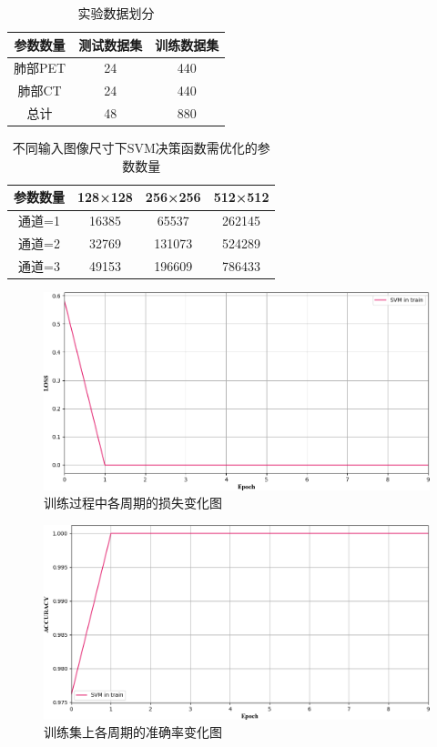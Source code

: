 \documentclass[twocolumn]{article}
\begin{document}
\begin{table}[h]
	\centering
	\caption{实验数据划分}
	\label{tab:dataset_partition_1}
	\begin{tabular}{ccc}
		\toprule
		参数数量 & 测试数据集 & 训练数据集 \\
		\midrule
		肺部PET & 24 & 440 \\
		肺部CT & 24 & 440 \\
		总计 & 48 & 880 \\
		\bottomrule
	\end{tabular}
\end{table}

\begin{table}[h]
	\centering
	\caption{不同输入图像尺寸下SVM决策函数需优化的参数数量}
	\label{tab:params_count}
	\begin{tabular}{cccc}
		\toprule
		参数数量 & 128×128 & 256×256 & 512×512 \\
		\midrule
		通道=1 & 16385 & 65537 & 262145 \\
		通道=2 & 32769 & 131073 & 524289 \\
		通道=3 & 49153 & 196609 & 786433 \\
		\bottomrule
	\end{tabular}
\end{table}

\begin{figure}[h]
    \centering
    \includegraphics[width=1.0\linewidth]{exp_log/train440_valid024/LOSS_train}
    \caption{训练过程中各周期的损失变化图}
    \label{fig:loss_train}
\end{figure}

\begin{figure}[h]
    \centering
    \includegraphics[width=1.0\linewidth]{exp_log/train440_valid024/ACCURACY_train}
    \caption{训练集上各周期的准确率变化图}
    \label{fig:acc_train}
\end{figure}
\end{document}
